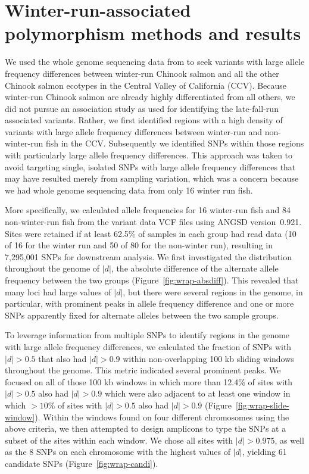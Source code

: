 
\section{Winter-run-associated polymorphism methods and results\label{sec:wrap-methods}}

We used the whole genome sequencing data from \citet{thompson2020complex} to seek variants with
large allele frequency differences between winter-run Chinook salmon and all the other
Chinook salmon ecotypes in the Central Valley of California (CCV).  Because winter-run Chinook salmon are
already highly differentiated from all others, we did not pursue an association study as used
for identifying the late-fall-run associated variants.  Rather, we first identified regions with a high
density of variants with large allele frequency differences between winter-run and non-winter-run
fish in the CCV\@. Subsequently we identified SNPs within those regions with particularly
large allele frequency differences.  This approach was taken to avoid targeting single, isolated SNPs
with large allele frequency differences that may have resulted merely from sampling variation, which was a
concern because we had whole genome sequencing data from only 16 winter run fish.

More specifically, we calculated allele frequencies for 16 winter-run fish and 84 non-winter-run
fish from the  \citet{thompson2020complex} variant data VCF files using ANGSD version~0.921.
Sites were retained if at least 62.5\% of samples in each group had read data (10 of 16 for the
winter run and 50 of 80 for the non-winter run), resulting in 7,295,001 SNPs for downstream
analysis.  We first investigated the distribution throughout the genome of $|d|$, the absolute difference
of the alternate allele frequency between the two groups  (Figure~\ref{fig:wrap-absdiff}). This revealed
that many loci had large values of $|d|$, but there were several
regions in the genome, in particular, with prominent peaks in allele frequency difference and one
or more SNPs apparently fixed for alternate alleles between the two sample groups.  

To leverage information from multiple SNPs to identify regions in the genome with large
allele frequency differences, we calculated the fraction of SNPs with $|d| > 0.5$ that also
had $|d| > 0.9$ within non-overlapping 100 kb sliding windows throughout the genome. This metric indicated
several prominent peaks.  We focused on all of those
100 kb windows in which more than 12.4\% of sites with $|d|>0.5$ also had $|d|>0.9$ which were
also adjacent to at least one window in which $>10\%$ of sites with $|d|>0.5$ also had $|d|>0.9$ 
(Figure~\ref{fig:wrap-slide-window}).  Within the windows found on four different chromosomes using
the above criteria, we then attempted to design amplicons to type the SNPs at a subset of the sites
within each window.  We chose all sites with $|d|>0.975$, as well as the 8 SNPs on each chromosome
with the highest values of $|d|$, yielding 61 candidate SNPs (Figure~\ref{fig:wrap-candi}).  


